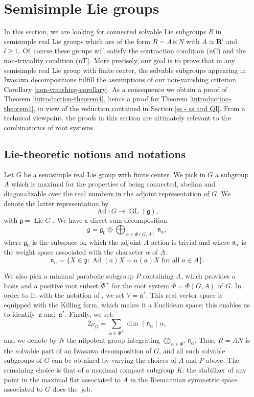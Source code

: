 \documentclass[JEP,XML,SOM,Unicode,published]{cedram}
\newcommand{\fra}{\mathfrak{a}}
\newcommand{\frg}{\mathfrak{g}}
\newcommand{\frn}{\mathfrak{n}}
\newcommand{\RR}{\mathbf{R}}
\theoremstyle{plain}
\theoremstyle{remark}
\theoremstyle{definition}
\DeclareMathOperator{\Ad}{Ad}
\DeclareMathOperator{\GL}{GL}
\DeclareMathOperator{\Lie}{Lie}
\begin{document}
\section{Semisimple Lie groups}
\label{s - semisimple}

In this section, we are looking for connected solvable Lie subgroups $R$ in semisimple real Lie groups which are of the form $R = A \ltimes N$ with $A \simeq \RR^l$ and $l \geqslant 1$.
Of~course these groups will satisfy the contraction condition (nC) and the non-triviality condition (nT).
More precisely, our goal is to prove that in any semisimple real Lie group with finite center, the solvable subgroups appearing in Iwasawa decompositions fulfill
the assumptions of our non-vanishing criterion Corollary \ref{non-vanishing-corollary}. As a consequence we obtain a proof of Theorem \ref{introduction-theorem4},
hence a proof for Theorem \ref{introduction-theorem1}, in view of the reduction contained in Section \ref{ss - ss and QI}.
From a technical viewpoint, the proofs in this section are ultimately relevant to the combinatorics of root systems.

\subsection{Lie-theoretic notions and notations}
\label{ss - combinatorial problem}
Let $G$ be a semisimple real Lie group with finite center.
We pick in $G$ a subgroup $A$ which is maximal for the properties of being connected, abelian and diagonalizable over the real numbers in the adjoint representation of $G$.
We denote the latter representation by
\[
\Ad: G \to \GL(\frg),
\]
with $\frg = \Lie G$ .
We have a direct sum decomposition
\[
\frg = \frg_0 \oplus \bigoplus_{\alpha \in \Phi(G,A)} \frn_\alpha,
\]
where $\frg_0$ is the subspace on which the adjoint $A$-action is trivial and where $\frn_\alpha$ is the weight space associated with the character $\alpha$ of $A$:
\[
\frn_\alpha = \{X \in \frg: \Ad(a)X = \alpha(a)X\text{ for all } a \in A\}.
\]

We also pick a minimal parabolic subgroup $P$ containing $A$, which provides a basis and a positive root subset $\Phi^+$ for the root system $\Phi=\Phi(G,A)$ of $G$.
In order to fit with the notation of \cite{BBK-Lie-4to6}, we set $V=\fra^*$.
This real vector space is equipped with the Killing form, which makes it a Euclidean space; this enables us to identify~$\fra$ and~$\fra^*$.
Finally, we set:
\[
2 \rho_G = \sum_{\alpha \in \Phi^+} \dim(\frn_\alpha) \alpha,
\]
and we denote by $N$ the nilpotent group integrating $\bigoplus_{\alpha \in \Phi^+} \frn_\alpha$.
Thus, $R=AN$ is the solvable part of an Iwasawa decomposition of $G$, and all such solvable subgroups of $G$ can be obtained by varying the choices of $A$ and $P$ above.
The remaining choice is that of a maximal compact subgroup $K$: the stabilizer of any point in the maximal flat associated to $A$ in the Riemannian symmetric space associated to $G$ does the~job.
\end{document}
